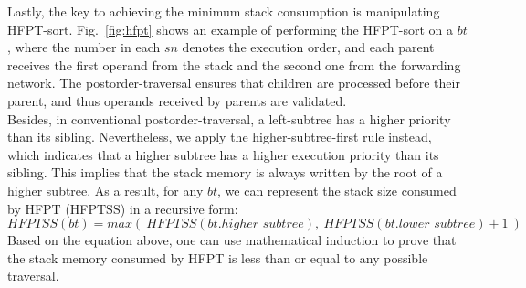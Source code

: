 \indent Lastly, the key to achieving the minimum stack consumption is manipulating HFPT-sort.
Fig.~\ref{fig:hfpt} shows an example of performing the HFPT-sort on a $bt$, 
where the number in each $sn$ denotes the execution order, 
and each parent receives the first operand from the stack and the second one from the forwarding network.
The postorder-traversal ensures that children are processed before their parent, 
and thus operands received by parents are validated. 
\\\indent
Besides, in conventional postorder-traversal, a left-subtree has a higher priority than its sibling.
Nevertheless, we apply the higher-subtree-first rule instead, 
which indicates that a higher subtree has a higher execution priority than its sibling.
This implies that the stack memory is always written by the root of a higher subtree.
As a result, for any $bt$, we can represent the stack size consumed by HFPT (HFPTSS) in a recursive form:
\begin{equation*}
    HFPTSS(bt) = max(\ HFPTSS(bt.higher\_subtree),\ HFPTSS(bt.lower\_subtree) + 1\ )
\end{equation*}
Based on the equation above, one can use mathematical induction to prove that the stack memory consumed by HFPT is less than or equal to any possible traversal.
